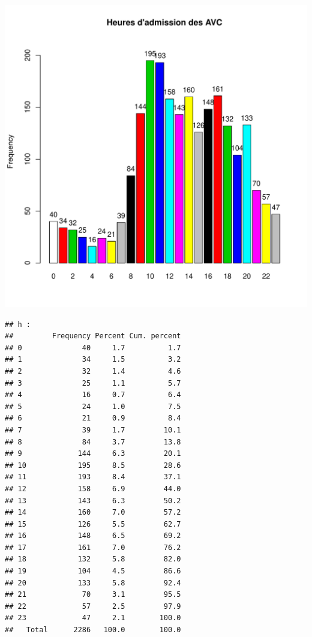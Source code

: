 \documentclass[12pt,english,french,twoside]{report}\usepackage[]{graphicx}\usepackage[]{color}
\makeatletter
\def\maxwidth{ %
  \ifdim\Gin@nat@width>\linewidth
    \linewidth
  \else
    \Gin@nat@width
  \fi
}
\newenvironment{kframe}{%
 \def\at@end@of@kframe{}%
 \ifinner\ifhmode%
  \def\at@end@of@kframe{\end{minipage}}%
  \begin{minipage}{\columnwidth}%
 \fi\fi%
 \def\FrameCommand##1{\hskip\@totalleftmargin \hskip-\fboxsep
 \colorbox{shadecolor}{##1}\hskip-\fboxsep
     \hskip-\linewidth \hskip-\@totalleftmargin \hskip\columnwidth}%
 \MakeFramed {\advance\hsize-\width
   \@totalleftmargin\z@ \linewidth\hsize
   \@setminipage}}%
 {\par\unskip\endMakeFramed%
 \at@end@of@kframe}
\newenvironment{knitrout}{}{} %
\makeatother
\begin{document}
\begin{knitrout}
\includegraphics[width=\maxwidth]{figure/heure_avc2} 
\begin{kframe}\begin{verbatim}
## h :  
##         Frequency Percent Cum. percent
## 0              40     1.7          1.7
## 1              34     1.5          3.2
## 2              32     1.4          4.6
## 3              25     1.1          5.7
## 4              16     0.7          6.4
## 5              24     1.0          7.5
## 6              21     0.9          8.4
## 7              39     1.7         10.1
## 8              84     3.7         13.8
## 9             144     6.3         20.1
## 10            195     8.5         28.6
## 11            193     8.4         37.1
## 12            158     6.9         44.0
## 13            143     6.3         50.2
## 14            160     7.0         57.2
## 15            126     5.5         62.7
## 16            148     6.5         69.2
## 17            161     7.0         76.2
## 18            132     5.8         82.0
## 19            104     4.5         86.6
## 20            133     5.8         92.4
## 21             70     3.1         95.5
## 22             57     2.5         97.9
## 23             47     2.1        100.0
##   Total      2286   100.0        100.0
\end{verbatim}
\end{kframe}
\end{knitrout}
\end{document}
